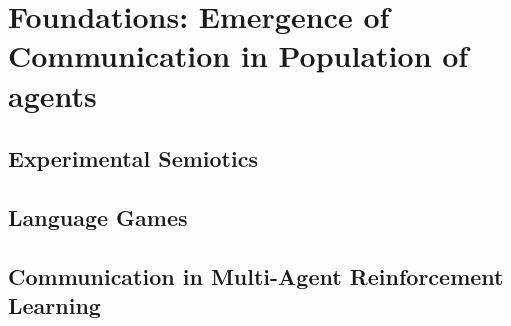 \chapter{Foundations: Emergence of Communication in Population of agents}

\minitoc


\section{Experimental Semiotics}

\section{Language Games}

\section{Communication in Multi-Agent Reinforcement Learning}